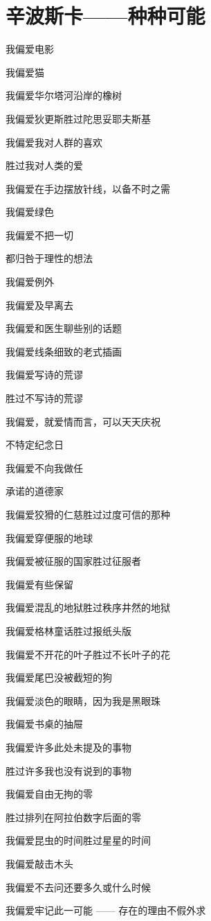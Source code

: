 \section{辛波斯卡——种种可能}

我偏爱电影

我偏爱猫

我偏爱华尔塔河沿岸的橡树

我偏爱狄更斯胜过陀思妥耶夫斯基

我偏爱我对人群的喜欢

胜过我对人类的爱

我偏爱在手边摆放针线，以备不时之需

我偏爱绿色

我偏爱不把一切

都归咎于理性的想法

我偏爱例外

我偏爱及早离去

我偏爱和医生聊些别的话题

我偏爱线条细致的老式插画

我偏爱写诗的荒谬

胜过不写诗的荒谬

我偏爱，就爱情而言，可以天天庆祝

不特定纪念日

我偏爱不向我做任

承诺的道德家

我偏爱狡猾的仁慈胜过过度可信的那种

我偏爱穿便服的地球

我偏爱被征服的国家胜过征服者

我偏爱有些保留

我偏爱混乱的地狱胜过秩序井然的地狱

我偏爱格林童话胜过报纸头版

我偏爱不开花的叶子胜过不长叶子的花

我偏爱尾巴没被截短的狗

我偏爱淡色的眼睛，因为我是黑眼珠

我偏爱书桌的抽屉

我偏爱许多此处未提及的事物

胜过许多我也没有说到的事物

我偏爱自由无拘的零

胜过排列在阿拉伯数字后面的零

我偏爱昆虫的时间胜过星星的时间

我偏爱敲击木头

我偏爱不去问还要多久或什么时候

我偏爱牢记此一可能 —— 存在的理由不假外求